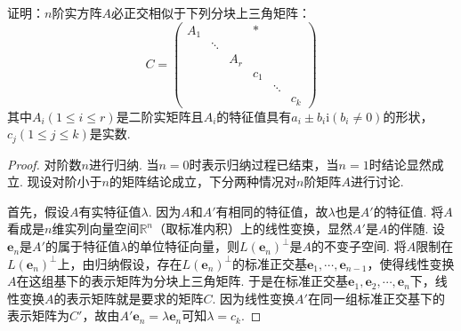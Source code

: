 \documentclass[../../main.tex]{subfiles}%
\begin{document}
\begin{proposition}\label{proposition:两个半正定阵可同时合同对角化7}
证明：\(n\)阶实方阵\(A\)必正交相似于下列分块上三角矩阵：
\[
C = 
\begin{pmatrix}
A_1 & & & * \\
& \ddots & & \\
& & A_r & \\
& & & c_1 & \\
& & & & \ddots & \\
& & & & & c_k
\end{pmatrix}
\]
其中\(A_i(1\leqslant  i\leqslant  r)\)是二阶实矩阵且\(A_i\)的特征值具有\(a_i\pm b_i\mathrm{i}(b_i\neq0)\)的形状，\(c_j(1\leqslant  j\leqslant  k)\)是实数.
\end{proposition}
\begin{proof}
对阶数\(n\)进行归纳. 当\(n = 0\)时表示归纳过程已结束，当\(n = 1\)时结论显然成立. 现设对阶小于\(n\)的矩阵结论成立，下分两种情况对\(n\)阶矩阵\(A\)进行讨论.

首先，假设\(A\)有实特征值\(\lambda\). 因为\(A\)和\(A'\)有相同的特征值，故\(\lambda\)也是\(A'\)的特征值. 将\(A\)看成是\(n\)维实列向量空间\(\mathbb{R}^n\)（取标准内积）上的线性变换，显然\(A'\)是\(A\)的伴随. 设\(\boldsymbol{e}_n\)是\(A'\)的属于特征值\(\lambda\)的单位特征向量，则\(L(\boldsymbol{e}_n)^\perp\)是\(A\)的不变子空间. 将\(A\)限制在\(L(\boldsymbol{e}_n)^\perp\)上，由归纳假设，存在\(L(\boldsymbol{e}_n)^\perp\)的标准正交基\(\boldsymbol{e}_1,\cdots,\boldsymbol{e}_{n - 1}\)，使得线性变换\(A\)在这组基下的表示矩阵为分块上三角矩阵. 于是在标准正交基\(\boldsymbol{e}_1,\boldsymbol{e}_2,\cdots,\boldsymbol{e}_n\)下，线性变换\(A\)的表示矩阵就是要求的矩阵\(C\). 因为线性变换\(A'\)在同一组标准正交基下的表示矩阵为\(C'\)，故由\(A'\boldsymbol{e}_n=\lambda\boldsymbol{e}_n\)可知\(\lambda = c_k\).


\end{proof}
\end{document}
